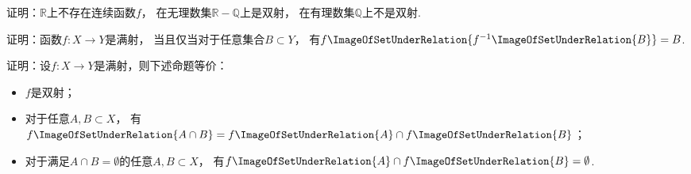 \begin{example}
证明：\(\mathbb{R}\)上不存在连续函数\(f\)，
在无理数集\(\mathbb{R} - \mathbb{Q}\)上是双射，
在有理数集\(\mathbb{Q}\)上不是双射.
\end{example}

\begin{example}
证明：函数\(f\colon X \to Y\)是满射，
当且仅当对于任意集合\(B \subset Y\)，
有\(f\ImageOfSetUnderRelation{f^{-1}\ImageOfSetUnderRelation{B}} = B\).
\end{example}

\begin{example}
证明：设\(f\colon X \to Y\)是满射，则下述命题等价：\begin{itemize}
	\item \(f\)是双射；
	\item 对于任意\(A,B \subset X\)，
	有\(f\ImageOfSetUnderRelation{A \cap B} = f\ImageOfSetUnderRelation{A} \cap f\ImageOfSetUnderRelation{B}\)；
	\item 对于满足\(A \cap B = \emptyset\)的任意\(A,B \subset X\)，
	有\(f\ImageOfSetUnderRelation{A} \cap f\ImageOfSetUnderRelation{B} = \emptyset\).
\end{itemize}
\end{example}

